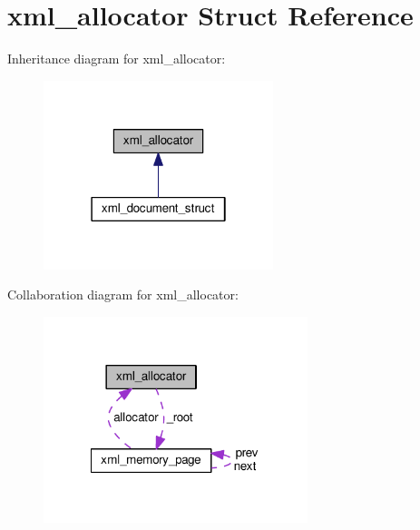 \hypertarget{structxml__allocator}{\section{xml\+\_\+allocator Struct Reference}
\label{structxml__allocator}
}


Inheritance diagram for xml\+\_\+allocator\+:
\nopagebreak
\begin{figure}[H]
\begin{center}
\leavevmode
\includegraphics[width=190pt]{structxml__allocator__inherit__graph}
\end{center}
\end{figure}


Collaboration diagram for xml\+\_\+allocator\+:
\nopagebreak
\begin{figure}[H]
\begin{center}
\leavevmode
\includegraphics[width=218pt]{structxml__allocator__coll__graph}
\end{center}
\end{figure}

